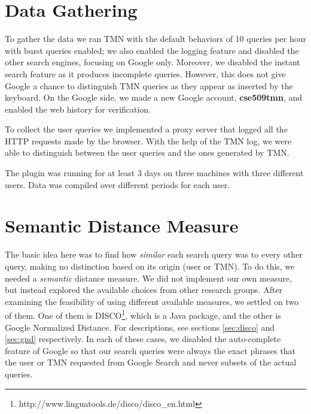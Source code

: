 \documentclass[11pt]{article}
\begin{document}
\begin{multicols}{2}
\section{Data Gathering}
To gather the data we ran TMN with the default behaviors of 10 queries per hour with burst queries enabled; we also enabled the logging feature and disabled the other search engines, focusing on Google only. Moreover, we disabled the instant search feature as it produces incomplete queries. However, this does not give Google a chance to distinguish TMN queries as they appear as inserted by the keyboard. On the Google side, we made a new Google account, \textbf{cse509tmn}, and enabled the web history for verification.

To collect the user queries we implemented a proxy server that logged all the HTTP requests made by the browser. With the help of the TMN log, we were able to distinguish between the user queries and the ones generated by TMN.

The plugin was running for at least 3 days on three machines with three different users. Data was compiled over different periods for each user.

\section{Semantic Distance Measure}
The basic idea here was to find how \textit{similar} each search query was to every other query, making no distinction based on its origin (user or TMN). To do this, we needed a \textit{semantic} distance measure. We did not implement our own measure, but instead explored the available choices from other research groups. After examining the feasibility of using different available measures, we settled on two of them. One of them is DISCO\footnote{http://www.linguatools.de/disco/disco\_en.html}, which is a Java package, and the other is Google Normalized Distance. For descriptions, see sections \ref{sec:disco} and \ref{sec:gnd} respectively. In each of these cases, we disabled the auto-complete feature of Google so that our search queries were always the exact phrases that the user or TMN requested from Google Search and never subsets of the actual queries.


\end{multicols}
\end{document}
